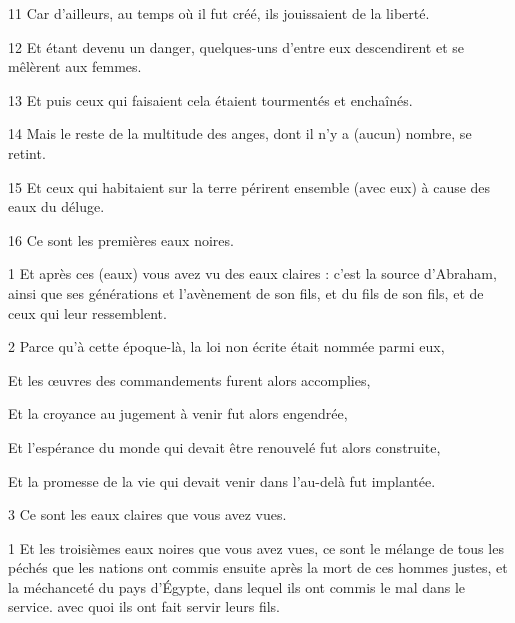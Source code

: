 \par 11 Car d'ailleurs, au temps où il fut créé, ils jouissaient de la liberté.

\par 12 Et étant devenu un danger, quelques-uns d'entre eux descendirent et se mêlèrent aux femmes.

\par 13 Et puis ceux qui faisaient cela étaient tourmentés et enchaînés.

\par 14 Mais le reste de la multitude des anges, dont il n'y a (aucun) nombre, se retint.

\par 15 Et ceux qui habitaient sur la terre périrent ensemble (avec eux) à cause des eaux du déluge.

\par 16 Ce sont les premières eaux noires.


\par 1 Et après ces (eaux) vous avez vu des eaux claires : c'est la source d'Abraham, ainsi que ses générations et l'avènement de son fils, et du fils de son fils, et de ceux qui leur ressemblent.

\par 2 Parce qu'à cette époque-là, la loi non écrite était nommée parmi eux,

\par Et les œuvres des commandements furent alors accomplies,

\par Et la croyance au jugement à venir fut alors engendrée,

\par Et l'espérance du monde qui devait être renouvelé fut alors construite,

\par Et la promesse de la vie qui devait venir dans l'au-delà fut implantée.

\par 3 Ce sont les eaux claires que vous avez vues.


\par 1 Et les troisièmes eaux noires que vous avez vues, ce sont le mélange de tous les péchés que les nations ont commis ensuite après la mort de ces hommes justes, et la méchanceté du pays d'Égypte, dans lequel ils ont commis le mal dans le service. avec quoi ils ont fait servir leurs fils.

